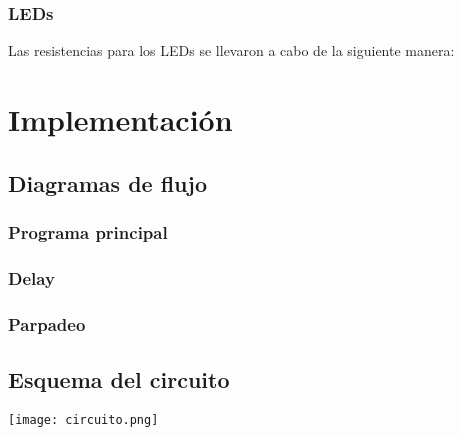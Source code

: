\documentclass[12pt,a4paper]{article}
\begin{document}
\subsubsection{LEDs}
	Las resistencias para los LEDs se llevaron a cabo de la siguiente manera:
	
\section{Implementación}
\subsection{Diagramas de flujo}
	\subsubsection{Programa principal}
	\subsubsection{Delay}
	\subsubsection{Parpadeo}
	
\newpage
\subsection{Esquema del circuito}

\texttt{[image: circuito.png]}

	
\end{document}
